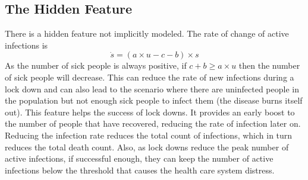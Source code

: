 \subsection{The Hidden Feature}
There is a hidden feature not implicitly modeled. The rate of change of active infections is \[
\dot{s}=(a\times u-c-b)\times s
\]
As the number of sick people is always positive, if \(c+b\geq a\times u\) then the number of sick people will decrease. This can reduce the rate of new infections during a lock down and can also lead to the scenario where there are uninfected people in the population but not enough sick people to infect them (the disease burns itself out). This feature helps the success of lock downs. It provides an early boost to the number of people that have recovered, reducing the rate of infection later on. Reducing the infection rate reduces the total count of infections, which in turn reduces the total death count. Also, as lock downs reduce the peak number of active infections, if successful enough, they can keep the number of active infections below the threshold that causes the health care system distress.